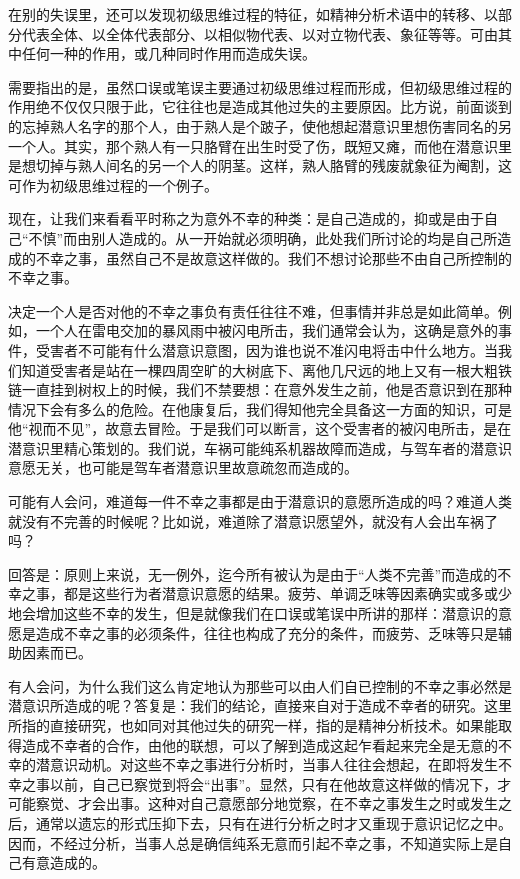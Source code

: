 \documentclass[UTF8,10pt,a4paper,openany]{book}
\begin{document}
在别的失误里，还可以发现初级思维过程的特征，如精神分析术语中的转移、以部分代表全体、以全体代表部分、以相似物代表、以对立物代表、象征等等。可由其中任何一种的作用，或几种同时作用而造成失误。

需要指出的是，虽然口误或笔误主要通过初级思维过程而形成，但初级思维过程的作用绝不仅仅只限于此，它往往也是造成其他过失的主要原因。比方说，前面谈到的忘掉熟人名字的那个人，由于熟人是个跛子，使他想起潜意识里想伤害同名的另一个人。其实，那个熟人有一只胳臂在出生时受了伤，既短又瘫，而他在潜意识里是想切掉与熟人间名的另一个人的阴茎。这样，熟人胳臂的残废就象征为阉割，这可作为初级思维过程的一个例子。

现在，让我们来看看平时称之为意外不幸的种类：是自己造成的，抑或是由于自己“不慎”而由别人造成的。从一开始就必须明确，此处我们所讨论的均是自己所造成的不幸之事，虽然自己不是故意这样做的。我们不想讨论那些不由自己所控制的不幸之事。

决定一个人是否对他的不幸之事负有责任往往不难，但事情并非总是如此简单。例如，一个人在雷电交加的暴风雨中被闪电所击，我们通常会认为，这确是意外的事件，受害者不可能有什么潜意识意图，因为谁也说不准闪电将击中什么地方。当我们知道受害者是站在一棵四周空旷的大树底下、离他几尺远的地上又有一根大粗铁链一直挂到树权上的时候，我们不禁要想：在意外发生之前，他是否意识到在那种情况下会有多么的危险。在他康复后，我们得知他完全具备这一方面的知识，可是他“视而不见”，故意去冒险。于是我们可以断言，这个受害者的被闪电所击，是在潜意识里精心策划的。我们说，车祸可能纯系机器故障而造成，与驾车者的潜意识意愿无关，也可能是驾车者潜意识里故意疏忽而造成的。

可能有人会问，难道每一件不幸之事都是由于潜意识的意愿所造成的吗？难道人类就没有不完善的时候呢？比如说，难道除了潜意识愿望外，就没有人会出车祸了吗？

回答是：原则上来说，无一例外，迄今所有被认为是由于“人类不完善”而造成的不幸之事，都是这些行为者潜意识意愿的结果。疲劳、单调乏味等因素确实或多或少地会增加这些不幸的发生，但是就像我们在口误或笔误中所讲的那样：潜意识的意愿是造成不幸之事的必须条件，往往也构成了充分的条件，而疲劳、乏味等只是辅助因素而已。

有人会问，为什么我们这么肯定地认为那些可以由人们自已控制的不幸之事必然是潜意识所造成的呢？答复是：我们的结论，直接来自对于造成不幸者的研究。这里所指的直接研究，也如同对其他过失的研究一样，指的是精神分析技术。如果能取得造成不幸者的合作，由他的联想，可以了解到造成这起乍看起来完全是无意的不幸的潜意识动机。对这些不幸之事进行分析时，当事人往往会想起，在即将发生不幸之事以前，自己已察觉到将会“出事”。显然，只有在他故意这样做的情况下，才可能察觉、才会出事。这种对自己意愿部分地觉察，在不幸之事发生之时或发生之后，通常以遗忘的形式压抑下去，只有在进行分析之时才又重现于意识记忆之中。因而，不经过分析，当事人总是确信纯系无意而引起不幸之事，不知道实际上是自己有意造成的。
\end{document}
